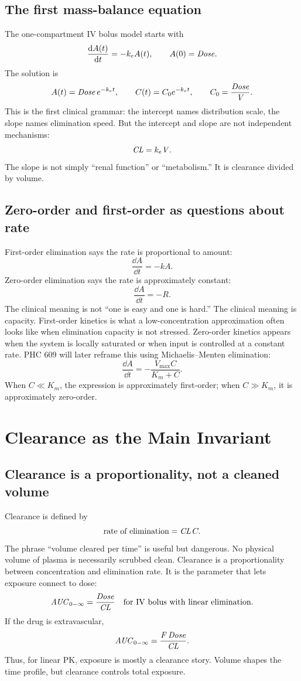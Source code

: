 \documentclass[a4paper]{article}
\newcommand{\pkCL}{\pksym{CL}}
\newcommand{\pkV}{\pksym{V}}
\newcommand{\pkF}{\pksym{F}}
\newcommand{\pkAUC}{\pksym{AUC}}
\newcommand{\pkke}{k_e}
\newcommand{\pkKm}{K_m}
\newcommand{\pkVmax}{V_{\max}}
\begin{document}
\subsection{The first mass-balance equation}

The one-compartment IV bolus model starts with
\[
  \frac{\dd A(t)}{\dd t}=-\pkke A(t),
  \qquad
  A(0)=\pksym{Dose}.
\]
The solution is
\[
  A(t)=\pksym{Dose}\,e^{-\pkke t},
  \qquad
  C(t)=C_0e^{-\pkke t},
  \qquad
  C_0=\frac{\pksym{Dose}}{\pkV}.
\]
This is the first clinical grammar: the intercept names distribution scale, the slope names elimination speed. But the intercept and slope are not independent mechanisms:
\[
  \pkCL=\pkke\pkV.
\]
The slope is not simply ``renal function'' or ``metabolism.'' It is clearance divided by volume.

\subsection{Zero-order and first-order as questions about rate}

First-order elimination says the rate is proportional to amount:
\[
  \frac{\dd A}{\dd t}=-kA.
\]
Zero-order elimination says the rate is approximately constant:
\[
  \frac{\dd A}{\dd t}=-R.
\]
The clinical meaning is not ``one is easy and one is hard.'' The clinical meaning is capacity. First-order kinetics is what a low-concentration approximation often looks like when elimination capacity is not stressed. Zero-order kinetics appears when the system is locally saturated or when input is controlled at a constant rate. PHC 609 will later reframe this using Michaelis--Menten elimination:
\[
  \frac{\dd A}{\dd t}
  =
  -\frac{\pkVmax C}{\pkKm+C}.
\]
When \(C\ll \pkKm\), the expression is approximately first-order; when \(C\gg \pkKm\), it is approximately zero-order.

\section{Clearance as the Main Invariant}

\subsection{Clearance is a proportionality, not a cleaned volume}

Clearance is defined by
\[
  \text{rate of elimination}=\pkCL\,C.
\]
The phrase ``volume cleared per time'' is useful but dangerous. No physical volume of plasma is necessarily scrubbed clean. Clearance is a proportionality between concentration and elimination rate. It is the parameter that lets exposure connect to dose:
\[
  \pkAUC_{0-\infty}=\frac{\pksym{Dose}}{\pkCL}
  \quad \text{for IV bolus with linear elimination}.
\]
If the drug is extravascular,
\[
  \pkAUC_{0-\infty}=\frac{\pkF\,\pksym{Dose}}{\pkCL}.
\]
Thus, for linear PK, exposure is mostly a clearance story. Volume shapes the time profile, but clearance controls total exposure.
\end{document}
